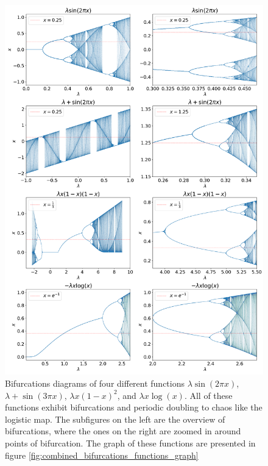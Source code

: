 \begin{figure}
	\centering
	\includegraphics[width=\textwidth]{./figures/combined_bifurcations.png}
	\caption{
		Bifurcations diagrams of four different functions 
		$ \lambda \sin(2\pi x)$,
		$ \lambda + \sin(3\pi x)$,
		$ \lambda x(1-x)^2$,
		and $ \lambda x \log(x)$.
		All of these functions exhibit bifurcations and periodic doubling to chaos like the logistic map. 
		The subfigures on the left are the overview of bifurcations, where the ones on the right are zoomed in around points of bifurcation.
		The graph of these functions are presented in figure \ref{fig:combined_bifurcations_functions_graph}
	}
	\label{fig:combined_bifurcations}
\end{figure}

